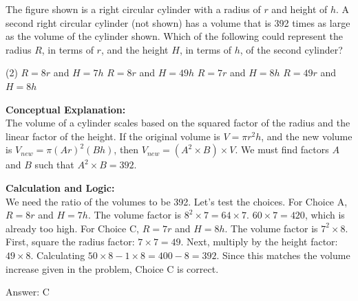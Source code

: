 \documentclass[11pt,paper=a4,answers]{exam}
\begin{document}
\begin{questions}
\question
\begin{center}
\end{center}
The figure shown is a right circular cylinder with a radius of $r$ and height of $h$. A second right circular cylinder (not shown) has a volume that is 392 times as large as the volume of the cylinder shown. Which of the following could represent the radius $R$, in terms of $r$, and the height $H$, in terms of $h$, of the second cylinder?
\begin{tasks}(2)
    \task $R = 8r$ and $H = 7h$
    \task $R = 8r$ and $H = 49h$
    \task $R = 7r$ and $H = 8h$
    \task $R = 49r$ and $H = 8h$
\end{tasks}

\begin{solution}
\textbf{Conceptual Explanation:} \\
The volume of a cylinder scales based on the squared factor of the radius and the linear factor of the height. If the original volume is $V = \pi r^2 h$, and the new volume is $V_{new} = \pi (Ar)^2 (Bh)$, then $V_{new} = (A^2 \times B) \times V$. We must find factors $A$ and $B$ such that $A^2 \times B = 392$.

\vspace{30pt}

\textbf{Calculation and Logic:} \\
We need the ratio of the volumes to be 392. Let's test the choices. For Choice A, $R = 8r$ and $H = 7h$. The volume factor is $8^2 \times 7 = 64 \times 7$. $60 \times 7 = 420$, which is already too high. For Choice C, $R = 7r$ and $H = 8h$. The volume factor is $7^2 \times 8$. First, square the radius factor: $7 \times 7 = 49$. Next, multiply by the height factor: $49 \times 8$. Calculating $50 \times 8 - 1 \times 8 = 400 - 8 = 392$. Since this matches the volume increase given in the problem, Choice C is correct.

\vspace{30pt}

Answer: \colorbox{yellow!100}{C}
\end{solution}


\end{questions}
\end{document}

